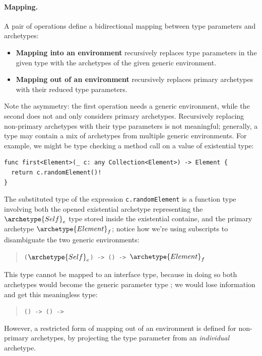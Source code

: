 \documentclass[../generics]{subfiles}
\begin{document}
\paragraph{Mapping.}
A pair of operations define a bidirectional mapping between type parameters and archetypes:
\begin{itemize}
\item {}\textbf{Mapping into an environment} recursively replaces type parameters in the given type with the archetypes of the given generic environment.
\item {}\textbf{Mapping out of an environment} recursively replaces primary archetypes with their reduced type parameters.
\end{itemize}
Note the asymmetry: the first operation needs a generic environment, while the second does not and only considers primary archetypes. Recursively replacing non-primary archetypes with their type parameters is not meaningful; generally, a type may contain a mix of archetypes from multiple generic environments. For example, we might be type checking a method call on a value of existential type:
\begin{Verbatim}
func first<Element>(_ c: any Collection<Element>) -> Element {
  return c.randomElement()!
}
\end{Verbatim}
The substituted type of the expression \texttt{c.randomElement} is a function type involving both the opened existential archetype representing the $\archetype{Self}_e$ type stored inside the existential containe, and the primary archetype $\archetype{Element}_f$; notice how we're using subscripts to disambiguate the two generic environments:
\begin{quote}
\texttt{($\archetype{Self}_e$) -> () -> $\archetype{Element}_f$}
\end{quote}
This type cannot be mapped to an interface type, because in doing so both archetypes would become the generic parameter type ; we would lose information and get this meaningless type:
\begin{quote}
\texttt{() -> () -> }
\end{quote}
However, a restricted form of mapping out of an environment is defined for non-primary archetypes, by projecting the type parameter from an \emph{individual} archetype.
\end{document}
